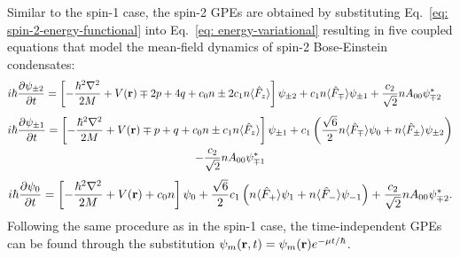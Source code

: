 Similar to the spin-1 case, the spin-2 GPEs are obtained by substituting
Eq.~\eqref{eq: spin-2-energy-functional} into Eq.~\eqref{eq: energy-variational}
resulting in five coupled equations that model the mean-field dynamics of spin-2
Bose-Einstein condensates:
\begin{align}\label{eq: spin-2-GPEs-pm2}   
    i\hbar\pdv{\psi_{\pm 2}}{t} &= \left[-\frac{\hbar^2\nabla^2}{2M}
        + V(\vb{r}) \mp 2p + 4q
        + c_0n \pm 2c_1n\langle\hat{F}_z\rangle\right]\psi_{\pm 2}
    + c_1n\langle\hat{F}_{\mp}\rangle\psi_{\pm 1}
    + \frac{c_2}{\sqrt{2}}nA_{00}\psi_{\mp 2}^*
\end{align}
\begin{multline}\label{eq: spin-2-GPEs-pm1}
    i\hbar\pdv{\psi_{\pm 1}}{t} = \left[-\frac{\hbar^2\nabla^2}{2M}
    + V(\vb{r}) \mp p + q
        + c_0n \pm c_1n\langle\hat{F}_z\rangle\right]\psi_{\pm 1}
    + c_1\left(\frac{\sqrt{6}}{2}n\langle\hat{F}_{\mp}\rangle\psi_0
    + n\langle\hat{F}_{\pm}\rangle\psi_{\pm 2}\right) \\
    - \frac{c_2}{\sqrt{2}}nA_{00}\psi_{\mp 1}^* 
\end{multline}
\begin{align}\label{eq: spin-2-GPEs-0}
    i\hbar\pdv{\psi_0}{t} = \left[-\frac{\hbar^2\nabla^2}{2M}
    + V(\vb{r}) + c_0n\right]\psi_0
    + \frac{\sqrt{6}}{2}c_1\left(n\langle\hat{F}_+\rangle\psi_1
    + n\langle\hat{F}_-\rangle\psi_{-1}\right)
    + \frac{c_2}{\sqrt{2}}nA_{00}\psi_{\mp 2}^*.
\end{align}
Following the same procedure as in the spin-1 case, the time-independent GPEs
can be found through the substitution \(\psi_m(\vb{r}, t) = \psi_m(\vb{r})
e^{-\mu t/\hbar}\).

